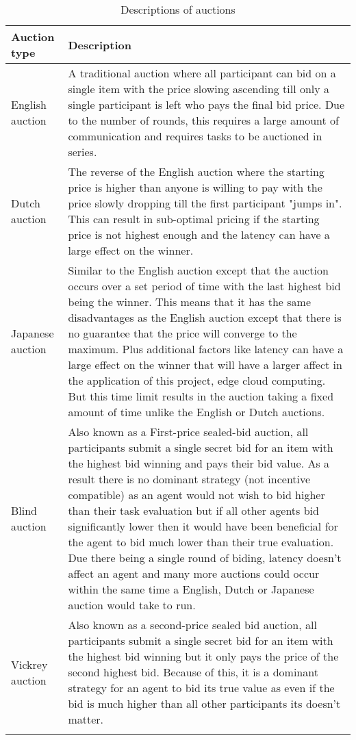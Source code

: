 \begin{longtable}{|p{3cm}|p{12cm}|} \hline
    \textbf{Auction type} & \textbf{Description} \\ \hline
    English auction & A traditional auction where all participant can bid on a single item with the price slowing ascending till
    only a single participant is left who pays the final bid price. Due to the number of rounds, this requires a large amount of
    communication and requires tasks to be auctioned in series. \\ \hline

    Dutch auction & The reverse of the English auction where the starting price is higher than anyone is willing to pay with the price
    slowly dropping till the first participant "jumps in". This can result in sub-optimal pricing if the starting price is not highest enough
    and the latency can have a large effect on the winner. \\ \hline

    Japanese auction & Similar to the English auction except that the auction occurs over a set period of time with the last highest
    bid being the winner. This means that it has the same disadvantages as the English auction except that there is no guarantee
    that the price will converge to the maximum. Plus additional factors like latency can have a large effect on the winner that
    will have a larger affect in the application of this project, edge cloud computing.
    But this time limit results in the auction taking a fixed amount of time unlike the English or Dutch auctions. \\ \hline

    Blind auction & Also known as a First-price sealed-bid auction, all participants submit a single secret bid for an item with the highest bid winning and
    pays their bid value. As a result there is no dominant strategy (not incentive compatible) as an agent would not wish to bid higher than their task evaluation
    but if all other agents bid significantly lower then it would have been beneficial for the agent to bid much lower than their true evaluation.
    Due there being a single round of biding, latency doesn't affect an agent and many more auctions could occur within the same time a English,
    Dutch or Japanese auction would take to run. \\ \hline

    Vickrey auction~\citep{vickrey} & Also known as a second-price sealed bid auction, all participants submit a single secret bid
    for an item with the highest bid winning but it only pays the price of the second highest bid. Because of this, it is a dominant
    strategy for an agent to bid its true value as even if the bid is much higher than all other participants its doesn't matter. \\ \hline

    \caption{Descriptions of auctions}
    \label{tab:auctions_descriptions}
\end{longtable}

